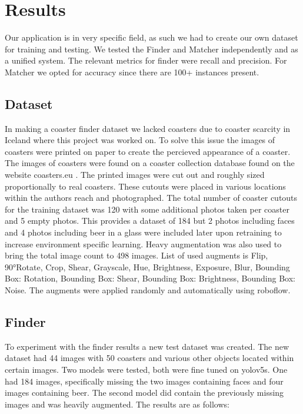 \documentclass{article}
\begin{document}
\section{Results}
Our application is in very specific field, as such we had to create our own dataset for training and testing.
We tested the Finder and Matcher independently and as a unified system.
The relevant metrics for finder were recall and precision. For Matcher we opted for accuracy since there are 100+ instances present.

\subsection{Dataset}
In making a coaster finder dataset we lacked coasters due to coaster scarcity in Iceland where this project was worked on.
To solve this issue the images of coasters were printed on paper to create the percieved appearance of a coaster. The images of coasters
were found on a coaster collection database found on the website coasters.eu \cite{}. The printed images were cut out and roughly sized proportionally to real coasters. 
These cutouts were placed in various locations within the authors reach and photographed. The total number of coaster cutouts for the 
training dataset was 120 with some additional photos taken per coaster and 5 empty photos. This provides a dataset of 184 but 2 photos
including faces and 4 photos including beer in a glass were included later upon retraining to increase environment specific learning.
Heavy augmentation was also used to bring the total image count to 498 images. List of used augments is Flip, 90°Rotate, Crop, Shear, Grayscale, Hue, Brightness, Exposure, Blur,
Bounding Box: Rotation, Bounding Box: Shear, Bounding Box: Brightness, Bounding Box: Noise. The augments were applied randomly and automatically using roboflow.

\newpage

\subsection{Finder}

To experiment with the finder results a new test dataset was created. The new dataset had 44 images with 50 coasters and various other objects located
within certain images. Two models were tested, both were fine tuned on yolov5s. One had 184 images, specifically missing the two images containing faces and four images containing beer.
The second model did contain the previously missing images and was heavily augmented. The results are as follows: 
\end{document}
